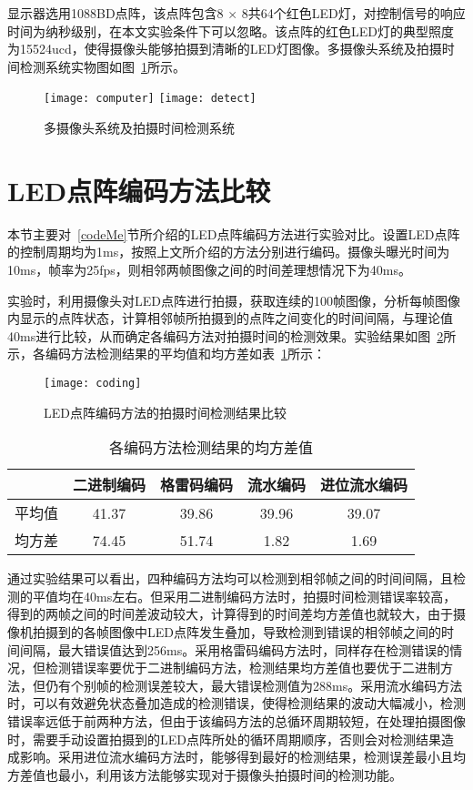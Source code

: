 显示器选用1088BD点阵，该点阵包含8 × 8共64个红色LED灯，对控制信号的响应时间为纳秒级别，在本文实验条件下可以忽略。该点阵的红色LED灯的典型照度为15524ucd，使得摄像头能够拍摄到清晰的LED灯图像。多摄像头系统及拍摄时间检测系统实物图如图~\ref{ss}所示。

\begin{figure}[h]
  \centering%
    {\texttt{[image: computer]}}
      {\texttt{[image: detect]}}
  \caption{多摄像头系统及拍摄时间检测系统}
  \label{ss}
\end{figure}

\section{LED点阵编码方法比较}

本节主要对~\ref{codeMe}节所介绍的LED点阵编码方法进行实验对比。设置LED点阵的控制周期均为1ms，按照上文所介绍的方法分别进行编码。摄像头曝光时间为10ms，帧率为25fps，则相邻两帧图像之间的时间差理想情况下为40ms。

实验时，利用摄像头对LED点阵进行拍摄，获取连续的100帧图像，分析每帧图像内显示的点阵状态，计算相邻帧所拍摄到的点阵之间变化的时间间隔，与理论值40ms进行比较，从而确定各编码方法对拍摄时间的检测效果。实验结果如图~\ref{coding}所示，各编码方法检测结果的平均值和均方差如表~\ref{codingT}所示：

\begin{figure}[h] 
  \centering
  \texttt{[image: coding]}
  \caption{LED点阵编码方法的拍摄时间检测结果比较}
    \label{coding}
\end{figure}

\begin{table}[h]
  \centering
  \caption{各编码方法检测结果的均方差值} 
  \label{codingT}
  \begin{tabular}{|c|c|c|c|c|}\hline
  &  二进制编码 &  格雷码编码 & 流水编码 &  进位流水编码 \\ \hline 
  平均值 & 41.37&39.86 &39.96&39.07\\ \hline
  均方差 & 74.45 & 51.74 & 1.82 &1.69\\ \hline
  \end{tabular}
\end{table}

通过实验结果可以看出，四种编码方法均可以检测到相邻帧之间的时间间隔，且检测的平值均在40ms左右。但采用二进制编码方法时，拍摄时间检测错误率较高，得到的两帧之间的时间差波动较大，计算得到的时间差均方差值也就较大，由于摄像机拍摄到的各帧图像中LED点阵发生叠加，导致检测到错误的相邻帧之间的时间间隔，最大错误值达到256ms。采用格雷码编码方法时，同样存在检测错误的情况，但检测错误率要优于二进制编码方法，检测结果均方差值也要优于二进制方法，但仍有个别帧的检测误差较大，最大错误检测值为288ms。采用流水编码方法时，可以有效避免状态叠加造成的检测错误，使得检测结果的波动大幅减小，检测错误率远低于前两种方法，但由于该编码方法的总循环周期较短，在处理拍摄图像时，需要手动设置拍摄到的LED点阵所处的循环周期顺序，否则会对检测结果造成影响。采用进位流水编码方法时，能够得到最好的检测结果，检测误差最小且均方差值也最小，利用该方法能够实现对于摄像头拍摄时间的检测功能。

